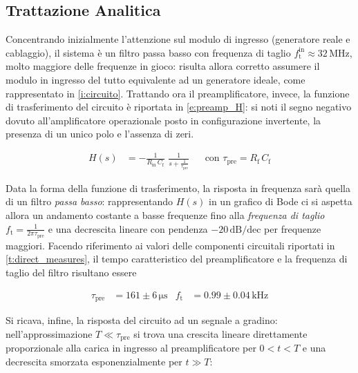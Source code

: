 \documentclass[a4paper,11pt]{article} %
\begin{document}

\subsection{Trattazione Analitica}\label{s:preamp_th} 

Concentrando inizialmente l'attenzione sul modulo di ingresso (generatore reale e cablaggio), il sistema è un filtro
passa basso con frequenza di taglio $f_{\text{t}}^{\text{in}}\approx 32 \,\si{\MHz}$, molto maggiore delle frequenze in
gioco: risulta allora corretto assumere il modulo in ingresso del tutto equivalente ad un generatore ideale, come
rappresentato in \autoref{i:circuito}. Trattando ora il preamplificatore, invece, la funzione di trasferimento del
circuito è riportata in \autoref{e:preamp_H}: si noti il segno negativo dovuto all'amplificatore operazionale posto in
configurazione invertente, la presenza di un unico polo e l'assenza di zeri. 

\begin{align}\label{e:preamp_H} 
	H(s) &= - \frac{ 1 }{ R_{\text{in}}\,C_{\text{f}} } \,\, \frac{1}{ s + \frac{1}{\tau_{\text{pre}} } } 
	& 
	&\text{con} \,\, \tau_{\text{pre}} = R_{\text{f}}\,C_{\text{f}}
\end{align} 

Data la forma della funzione di trasferimento, la risposta in frequenza sarà quella di un filtro \textit{passa basso}:
rappresentando $H(s)$ in un grafico di Bode ci si aspetta allora un andamento costante a basse frequenze fino alla
\textit{frequenza di taglio} $f_{\text{t}}=\frac{1}{2\pi\tau_{\text{pre}}}$ e una decrescita lineare con pendenza
$-20\,\text{dB/dec}$ per frequenze maggiori. Facendo riferimento ai valori delle componenti circuitali riportati in
\autoref{t:direct_measures}, il tempo caratteristico del preamplificatore e la frequenza di taglio del filtro risultano
essere

\begin{align}\label{e:preamp_stime_th}
	\tau_{\text{pre}} & = 161 \pm 6 \,\si{\us}
	&
	f_{\text{t}} & = 0.99 \pm 0.04 \,\si{\kilo\Hz}
\end{align}

Si ricava, infine, la risposta del circuito ad un segnale a gradino: nell'approssimazione $T\ll\tau_{\text{pre}}$ si trova
una crescita lineare direttamente proporzionale alla carica in ingresso al preamplificatore per $0 < t < T$ e una
decrescita smorzata esponenzialmente per $t \gg T$:
\end{document}
